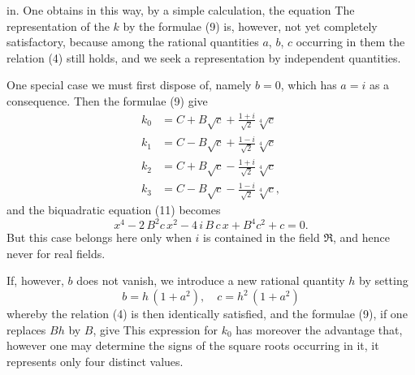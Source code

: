 
in. One obtains in this way, by a simple calculation, the equation
The representation of the $k$ by the formulae (9) is, however, not yet completely satisfactory, because among the rational quantities $a$, $b$, $c$ occurring in them the relation (4) still holds, and we seek a representation by independent quantities.

One special case we must first dispose of, namely $b = 0$, which has $a = i$ as a consequence. Then the formulae (9) give
\[
\begin{aligned}
k_0 &= C + B\sqrt{c} + \frac{1+i}{\sqrt{2}}\sqrt[4]{c}\\
k_1 &= C - B\sqrt{c} + \frac{1-i}{\sqrt{2}}\sqrt[4]{c}\\
k_2 &= C + B\sqrt{c} - \frac{1+i}{\sqrt{2}}\sqrt[4]{c}\\
k_3 &= C - B\sqrt{c} - \frac{1-i}{\sqrt{2}}\sqrt[4]{c},
\end{aligned}
\]
and the biquadratic equation (11) becomes
\[
x^4 - 2\,B^2c\,x^2 - 4\,i\,B\,c\,x + B^4c^2 + c = 0.
\]
But this case belongs here only when $i$ is contained in the field $\mathfrak{R}$, and hence never for real fields.

If, however, $b$ does not vanish, we introduce a new rational quantity $h$ by setting
\[
b = h\,(1 + a^2), \quad c = h^2\,(1 + a^2)
\]
whereby the relation (4) is then identically satisfied, and the formulae (9), if one replaces $Bh$ by $B$, give
This expression for $k_0$ has moreover the advantage that, however one may determine the signs of the square roots occurring in it, it represents only four distinct values.
